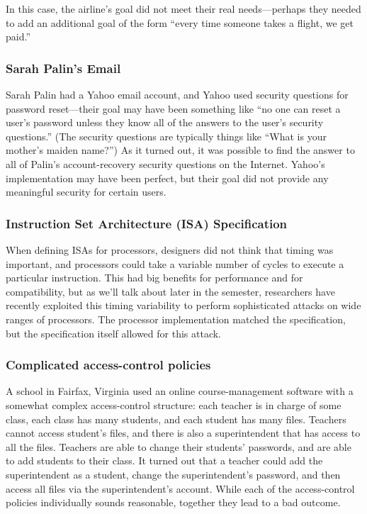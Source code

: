 In this case, the airline's goal did not meet
their real needs---perhaps they needed to add
an additional goal of the form ``every time someone takes a flight,
we get paid.''

\subsubsection{Sarah Palin's Email}
Sarah Palin had a Yahoo email account, and Yahoo
used security questions for password reset---their
goal may have been something like ``no one can
reset a user's password unless they know all of
the answers to the user's security questions.''
(The security questions are typically things like
``What is your mother's maiden name?'')
As it turned out, it was possible to find the answer
to all of Palin's account-recovery security questions 
on the Internet.\cite{palin}
Yahoo's implementation may have been perfect, but their
goal did not provide any meaningful security for certain users.

\subsubsection{Instruction Set Architecture (ISA) Specification}
When defining ISAs for processors, designers did
not think that timing was important, and
processors could take a variable number of cycles
to execute a particular instruction.
This had big benefits for performance and for
compatibility, but as we'll talk about later in
the semester, researchers have recently exploited
this timing variability to perform sophisticated
attacks on wide ranges of processors.\cite{hill:spectre-meltdown}
The processor implementation matched the
specification, but the specification itself
allowed for this attack.

\subsubsection{Complicated access-control policies}
A school in Fairfax, Virginia used an online
course-management software with a somewhat complex
access-control structure: each teacher is in charge of some
class, each class has many students, and each
student has many files. Teachers cannot access
student's files, and there is also
a superintendent that has access to all the files.
Teachers are able to change their students'
passwords, and are able to add students to their
class. It turned out that a teacher could add the
superintendent as a student, change the
superintendent's password, and then access all
files via the superintendent's account.
While each of the access-control policies individually
sounds reasonable, together they lead to a bad outcome.


